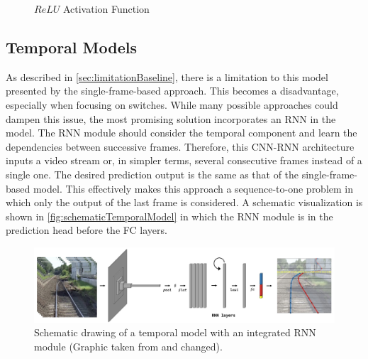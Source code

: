 \begin{figure}[H]
    \centering
    \caption{$ReLU$ Activation Function \cite{pytorch_relu_docu}}
    \label{fig:ReLU}
\end{figure}

\subsection{Temporal Models}
\label{sec:temporalModels}

As described in \autoref{sec:limitationBaseline}, there is a limitation to this model presented by the single-frame-based approach.
This becomes a disadvantage, especially when focusing on switches.
While many possible approaches could dampen this issue, the most promising solution incorporates an \ac{RNN} in the model.
The \ac{RNN} module should consider the temporal component and learn the dependencies between successive frames.
Therefore, this \ac{CNN}-\ac{RNN} architecture inputs a video stream or, in simpler terms, several consecutive frames instead of a single one.
The desired prediction output is the same as that of the single-frame-based model.
This effectively makes this approach a sequence-to-one problem in which only the output of the last frame is considered.
A schematic visualization is shown in \autoref{fig:schematicTemporalModel} in which the \ac{RNN} module is in the prediction head before the \ac{FC} layers.

\begin{figure}[H]
    \centering
    \includegraphics[width=\linewidth]{PICs//temporalModels/schematicDrawing.jpg}
    \caption{Schematic drawing of a temporal model with an integrated \ac{RNN} module (Graphic taken from \cite{tepNet2024} and changed).}
    \label{fig:schematicTemporalModel}
\end{figure}

